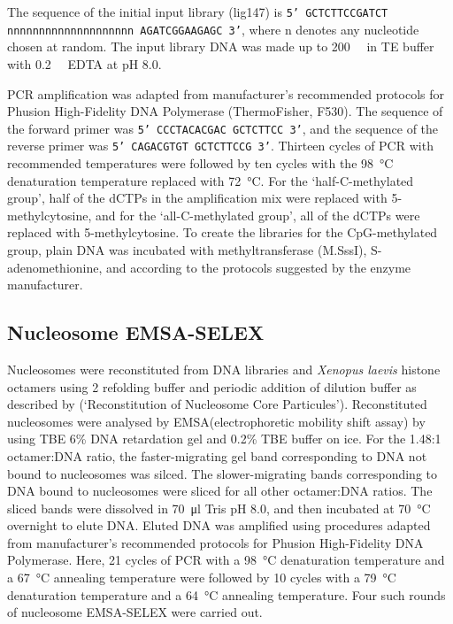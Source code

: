 \documentclass[parskip=full, numbers=noenddot]{scrbook}
\begin{document}
The sequence of the initial input library (lig147) is \texttt{5' GCTCTTCCGATCT nnnnnnnnn\-nnnnnnnnnnn AGATCGGAAGAGC 3'}, where n denotes any nucleotide chosen at random. The input library DNA was made up to \SI{200}{\nano\Molar} in TE buffer with \SI{0.2}{\milli\Molar} EDTA at pH 8.0.

PCR amplification was adapted from manufacturer's recommended protocols for Phusion High-Fidelity DNA Polymerase (ThermoFisher, F530).  The sequence of the forward primer was \texttt{5' CCCTACACGAC GCTCTTCC 3'}, and the sequence of the reverse primer was \texttt{5' CAGACGTGT GCTCTTCCG 3'}.  Thirteen cycles of PCR with recommended temperatures were followed by ten cycles with the \SI{98}{\celsius} denaturation temperature replaced with \SI{72}{\celsius}.  For the `half-C-methylated group', half of the dCTPs in the amplification mix were replaced with 5-methylcytosine, and for the `all-C-methylated group', all of the dCTPs were replaced with 5-methylcytosine.  To create the libraries for the CpG-methylated group, plain DNA was incubated with methyltransferase (M.SssI), S-adenomethionine, and  according to the protocols suggested by the enzyme manufacturer.

\subsection{Nucleosome EMSA-SELEX}
\label{ssec:emsaselex_methods_selex}

Nucleosomes were reconstituted from DNA libraries and \emph{Xenopus laevis} histone octamers using \SI{2}{\Molar}  refolding buffer and periodic addition of dilution buffer as described by \citet{dyer_reconstitution_2003} (`Reconstitution of Nucleosome Core Particules').  Reconstituted nucleosomes were analysed by EMSA(electrophoretic mobility shift assay) by using TBE 6\% DNA retardation gel and 0.2\% TBE buffer on ice.  For the 1.48:1 octamer:DNA ratio, the faster-migrating gel band corresponding to DNA not bound to nucleosomes was silced.  The slower-migrating bands corresponding to DNA bound to nucleosomes were sliced for all other octamer:DNA ratios.  The sliced bands were dissolved in \SI{70}{\micro\litre} Tris pH 8.0, and then incubated at \SI{70}{\celsius} overnight to elute DNA.  Eluted DNA was amplified using procedures adapted from manufacturer's recommended protocols for Phusion High-Fidelity DNA Polymerase.  Here, 21 cycles of PCR with a \SI{98}{\celsius} denaturation temperature and a \SI{67}{\celsius} annealing temperature were followed by 10 cycles with a \SI{79}{\celsius} denaturation temperature and a \SI{64}{\celsius} annealing temperature.  Four such rounds of nucleosome EMSA-SELEX were carried out.
\end{document}
